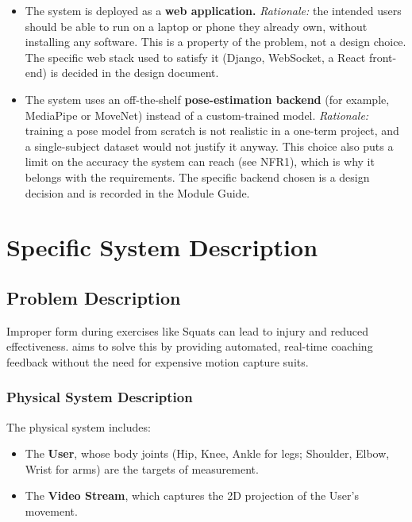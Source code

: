 \documentclass[12pt]{article}
\begin{document}
\begin{itemize}
  \item The system is deployed as a \textbf{web application.}
    \emph{Rationale:} the intended users should be able to run
    \progname{} on a laptop or phone they already own, without
    installing any software. This is a property of the problem, not a
    design choice. The specific web stack used to satisfy it (Django,
    WebSocket, a React front-end) is decided in the design document.
  \item The system uses an off-the-shelf \textbf{pose-estimation
    backend} (for example, MediaPipe or MoveNet) instead of a
    custom-trained model. \emph{Rationale:} training a pose model from
    scratch is not realistic in a one-term project, and a
    single-subject dataset would not justify it anyway. This choice
    also puts a limit on the accuracy the system can reach (see NFR1),
    which is why it belongs with the requirements. The specific
    backend chosen is a design decision and is recorded in the Module
    Guide.
\end{itemize}

\section{Specific System Description}

\subsection{Problem Description} \label{Sec_pd}
Improper form during exercises like Squats can lead to injury and reduced effectiveness. \progname{} aims to solve this by providing automated, real-time coaching feedback without the need for expensive motion capture suits.

\subsubsection{Physical System Description} \label{sec_phySystDescrip}
The physical system includes:
\begin{itemize}
\item[PS1:] The \textbf{User}, whose body joints (Hip, Knee, Ankle for legs; Shoulder, Elbow, Wrist for arms) are the targets of measurement.
\item[PS2:] The \textbf{Video Stream}, which captures the 2D projection of the User's movement.
\end{itemize}
\end{document}
